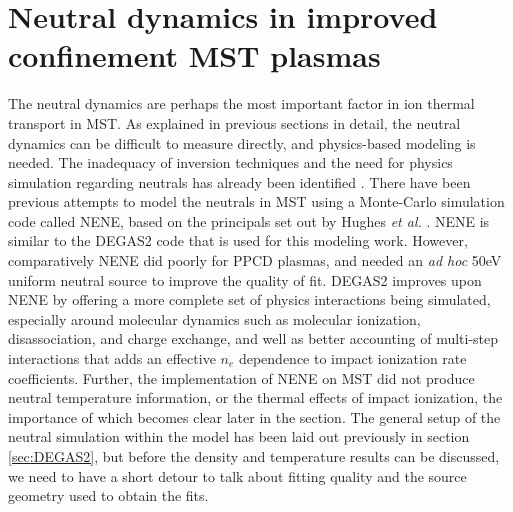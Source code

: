 

\section{Neutral dynamics in improved confinement MST plasmas}\label{sec:neutral_results}

The neutral dynamics are perhaps the most important factor in ion thermal transport in MST. As explained in previous sections in detail, the neutral dynamics can be difficult to measure directly, and physics-based modeling is needed. The inadequacy of inversion techniques and the need for physics simulation regarding neutrals has already been identified \cite{Eilerman2012}. There have been previous attempts to model the neutrals in MST using a Monte-Carlo simulation code called NENE, based on the principals set out by Hughes \textit{et al.} \cite{Hughes1978}. %
NENE is similar to the DEGAS2 code that is used for this modeling work.
However, comparatively NENE did poorly for PPCD plasmas, and needed an \textit{ad hoc} 50eV uniform neutral source to improve the quality of fit\cite{Eilerman}. DEGAS2 improves upon NENE by offering a more complete set of physics interactions being simulated, especially around molecular dynamics such as molecular ionization, disassociation, and charge exchange, and well as better accounting of multi-step interactions that adds an effective $n_e$ dependence to impact ionization rate coefficients\cite{Stotler,Janev1984}. Further, the implementation of NENE on MST did not produce neutral temperature information, or the thermal effects of impact ionization, the importance of which becomes clear later in the section. The general setup of the neutral simulation within the model has been laid out previously in section \ref{sec:DEGAS2}, but before the density and temperature results can be discussed, we need to have a short detour to talk about fitting quality and the source geometry used to obtain the fits.

